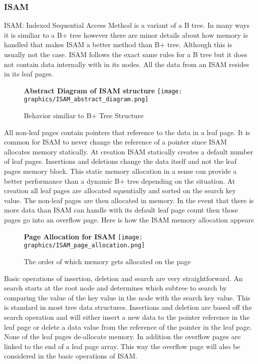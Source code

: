 \documentclass[letterpaper, 12pt]{article}
\begin{document}
\subsubsection{ISAM}
ISAM:
Indexed Sequential Access Method is a variant of a B tree. In many ways it is similiar to a B+ tree however there are minor details about how memory is handled
that makes ISAM a better method than B+ tree. Although this is usually not the case. ISAM follows the exact same rules for a B tree but it does not contain
data internally with in its nodes. All the data from an ISAM resides in its leaf pages.

\begin{figure}
  \centering
  \textbf{Abstract Diagram of ISAM structure}
  \texttt{[image: graphics/ISAM\_abstract\_diagram.png]}
  \cite{ramakrishnan2000database}
  \caption{Behavior similiar to B+ Tree Structure}
\end{figure}

All non-leaf pages contain pointers that reference to the data in a leaf page. It is common for
ISAM to never change the reference of a pointer since ISAM allocates memory statically. At creation
ISAM statically creates a default number of leaf pages. Insertions and deletions change the data
itself and not the leaf pages memory block. This static memory allocation in a sense can
provide a better performance than a dynamic B+ tree depending on the situation. At creation all
leaf pages are allocated squentially and sorted on the search key value. The non-leaf pages
are then allocated in memory. In the event that there is more data than ISAM can handle with its
default leaf page count then those pages go into an overflow page. Here is how the ISAM memory
allocation appears
\par\vspace{\baselineskip}

\begin{figure}
  \centering
  \textbf{Page Allocation for ISAM}
  \texttt{[image: graphics/ISAM\_page\_allocation.png]}
  \cite{ramakrishnan2000database}
  \caption{The order of which memory gets allocated on the page}
\end{figure}

Basic operations of insertion, deletion and search are very straightforward. An search starts at the
root node and determines which subtree to search by comparing the value of the key value in the node
with the search key value. This is standard in most tree data structures. Insertions and deletion are
based off the search operation and will either insert a new data to the pointer reference in the leaf
page or delete a data value from the reference of the pointer in the leaf page. None of the leaf
pages de-allocate memory. In addition the overflow pages are linked to the end of a leaf page array.
This way the overflow page will also be considered in the basic operations of ISAM.
\par\vspace{\baselineskip}
\end{document}
